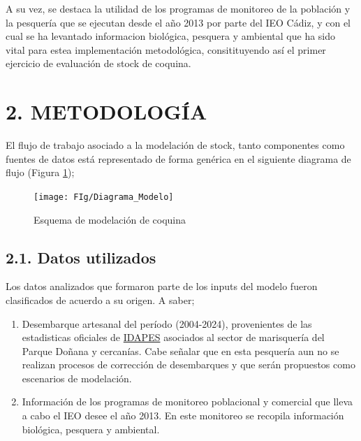 \documentclass[
]{article}
\begin{document}
A su vez, se destaca la utilidad de los programas de monitoreo de la población y la pesquería que se ejecutan desde el año 2013 por parte del IEO Cádiz, y con el cual se ha levantado informacion biológica, pesquera y ambiental que ha sido vital para estea implementación metodológica, consitituyendo así el primer ejercicio de evaluación de stock de coquina.

\hypertarget{metodologuxeda}{%
\section{2. METODOLOGÍA}\label{metodologuxeda}}

El flujo de trabajo asociado a la modelación de stock, tanto componentes como fuentes de datos está representado de forma genérica en el siguiente diagrama de flujo (Figura \ref{fig:esq});

\begin{landscape}

\begin{figure}

{\centering \texttt{[image: FIg/Diagrama\_Modelo]} 

}

\caption{\label{esq}Esquema de modelación de coquina}\label{fig:esq}
\end{figure}

\end{landscape}

\pagebreak

\hypertarget{datos-utilizados}{%
\subsection{2.1. Datos utilizados}\label{datos-utilizados}}

Los datos analizados que formaron parte de los inputs del modelo fueron clasificados de acuerdo a su origen. A saber;

\begin{enumerate}
\def\labelenumi{\alph{enumi}.}
\item
  Desembarque artesanal del período (2004-2024), provenientes de las estadisticas oficiales de \href{https://www.juntadeandalucia.es/agriculturaypesca/idapes/servlet/FrontController}{IDAPES} asociados al sector de marisquería del Parque Doñana y cercanías. Cabe señalar que en esta pesquería aun no se realizan procesos de corrección de desembarques y que serán propuestos como escenarios de modelación.
\item
  Información de los programas de monitoreo poblacional y comercial que lleva a cabo el IEO desee el año 2013. En este monitoreo se recopila información biológica, pesquera y ambiental.
\end{enumerate}
\end{document}
